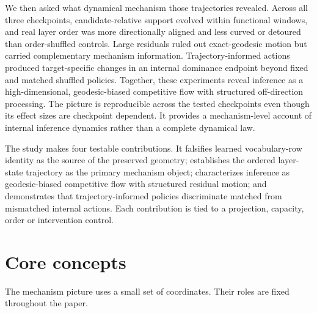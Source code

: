 \documentclass[11pt]{article}
\begin{document}
We then asked what dynamical mechanism those trajectories revealed. Across all three checkpoints, candidate-relative support evolved within functional windows, and real layer order was more directionally aligned and less curved or detoured than order-shuffled controls. Large residuals ruled out exact-geodesic motion but carried complementary mechanism information. Trajectory-informed actions produced target-specific changes in an internal dominance endpoint beyond fixed and matched shuffled policies. Together, these experiments reveal inference as a high-dimensional, geodesic-biased competitive flow with structured off-direction processing. The picture is reproducible across the tested checkpoints even though its effect sizes are checkpoint dependent. It provides a mechanism-level account of internal inference dynamics rather than a complete dynamical law.

The study makes four testable contributions. It falsifies learned vocabulary-row identity as the source of the preserved geometry; establishes the ordered layer-state trajectory as the primary mechanism object; characterizes inference as geodesic-biased competitive flow with structured residual motion; and demonstrates that trajectory-informed policies discriminate matched from mismatched internal actions. Each contribution is tied to a projection, capacity, order or intervention control.

\section*{Core concepts}
The mechanism picture uses a small set of coordinates. Their roles are fixed throughout the paper.
\end{document}
